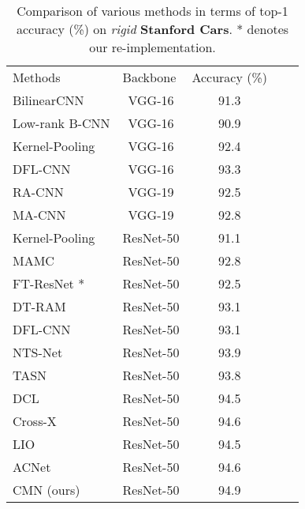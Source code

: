 \documentclass[journal]{IEEEtran}
\begin{document}
\setlength{\tabcolsep}{6pt}
\begin{table}[t]
\caption{Comparison of various methods in terms of top-1 accuracy (\%) on \emph{rigid} \textbf{Stanford Cars}. * denotes our re-implementation.}
\small
\begin{center}
\begin{tabular}{|l|c|c|c|c|}
\hline
\multicolumn{1}{|l|}{\multirow{2}{*}{Methods}}& \multicolumn{1}{l|}{\multirow{2}{*}{Backbone}}& \multicolumn{1}{l|}{\multirow{2}{*}{Accuracy (\%)}}\\
\multicolumn{1}{|c|}{} & {}  &\\
\hline\hline
BilinearCNN \cite{LinRM18} & VGG-16  &91.3 \\
Low-rank B-CNN \cite{kong2017low}& VGG-16 &90.9 \\
Kernel-Pooling \cite{cui2017kernel}&VGG-16 & 92.4 \\
DFL-CNN \cite{wang2018learning}&VGG-16 &93.3\\
\hline
RA-CNN \cite{fu2017look} & VGG-19  & 92.5\\
MA-CNN \cite{zheng2017learning}& VGG-19  & 92.8 \\
\hline
Kernel-Pooling \cite{cui2017kernel}&ResNet-50 & 91.1\\
MAMC \cite{sun2018multi}& ResNet-50  & 92.8 \\
FT-ResNet \cite{he2016deep}* & ResNet-50  &92.5 \\
DT-RAM \cite{li2017dynamic} & ResNet-50 &93.1\\
DFL-CNN \cite{wang2018learning}& ResNet-50 & 93.1\\
NTS-Net \cite{yang2018learning} & ResNet-50  & 93.9\\
TASN \cite{zheng2019looking} &ResNet-50 & 93.8 \\
DCL \cite{Chen_2019_CVPR} & ResNet-50  & 94.5 \\
Cross-X \cite{luo2019cross} & ResNet-50  &{94.6}\\
LIO \cite{Zhou_2020_CVPR} & ResNet-50  &94.5\\
ACNet \cite{ji2020attention} & ResNet-50  &94.6\\
\hline
 \rowcolor{mygray} {CMN (ours)} & ResNet-50 & {94.9} \\
\hline
\end{tabular}
\end{center}
\label{tab3}
\end{table}
\setlength{\tabcolsep}{8pt}
\end{document}
